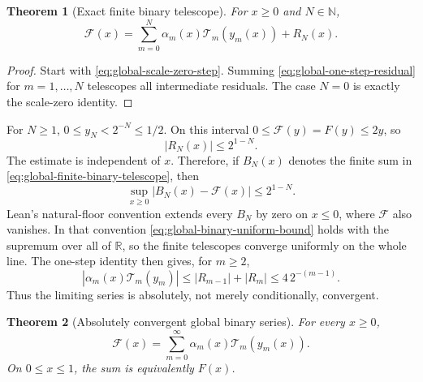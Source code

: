 \documentclass[11pt,oneside]{article}
\newtheorem{theorem}{Theorem}[section]
\theoremstyle{definition}
\theoremstyle{remark}
\newcommand{\R}{\mathbb R}
\newcommand{\N}{\mathbb N}
\begin{document}
\begin{theorem}[Exact finite binary telescope]
For $x\ge0$ and $N\in\N$,
\begin{equation}
 \boxed{
 \mathcal F(x)=
 \sum_{m=0}^{N}\alpha_m(x)\mathcal T_m(y_m(x))+R_N(x).}
                                                               \label{eq:global-finite-binary-telescope}
\end{equation}
\end{theorem}

\begin{proof}
Start with \eqref{eq:global-scale-zero-step}.  Summing
\eqref{eq:global-one-step-residual} for $m=1,\ldots,N$ telescopes all intermediate residuals.
The case $N=0$ is exactly the scale-zero identity.
\end{proof}

For $N\ge1$, $0\le y_N<2^{-N}\le1/2$.  On this interval
$0\le\mathcal F(y)=F(y)\le2y$, so
\begin{equation}
 |R_N(x)|\le2^{1-N}.                                     \label{eq:global-residual-bound}
\end{equation}
The estimate is independent of $x$.  Therefore, if $B_N(x)$ denotes the finite sum in
\eqref{eq:global-finite-binary-telescope}, then
\begin{equation}
 \sup_{x\ge0}|B_N(x)-\mathcal F(x)|\le2^{1-N}.            \label{eq:global-binary-uniform-bound}
\end{equation}
Lean's natural-floor convention extends every $B_N$ by zero on $x\le0$, where
$\mathcal F$ also vanishes.  In that convention \eqref{eq:global-binary-uniform-bound}
holds with the supremum over all of $\R$, so the finite telescopes converge uniformly on
the whole line.
The one-step identity then gives, for $m\ge2$,
\begin{equation}
 |\alpha_m(x)\mathcal T_m(y_m)|
 \le |R_{m-1}|+|R_m|\le4\,2^{-(m-1)}.                   \label{eq:global-summand-majorant}
\end{equation}
Thus the limiting series is absolutely, not merely conditionally, convergent.

\begin{theorem}[Absolutely convergent global binary series]
For every $x\ge0$,
\begin{equation}
 \boxed{
 \mathcal F(x)=\sum_{m=0}^{\infty}
 \alpha_m(x)\mathcal T_m(y_m(x)).}                       \label{eq:global-binary-reduction-series}
\end{equation}
On $0\le x\le1$, the sum is equivalently $F(x)$.
\end{theorem}
\end{document}
